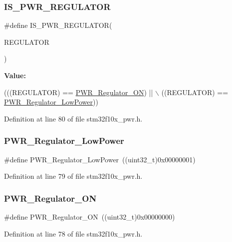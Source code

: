 \subsubsection{\texorpdfstring{I\+S\+\_\+\+P\+W\+R\+\_\+\+R\+E\+G\+U\+L\+A\+T\+OR}{IS\_PWR\_REGULATOR}}
{\footnotesize\ttfamily \#define I\+S\+\_\+\+P\+W\+R\+\_\+\+R\+E\+G\+U\+L\+A\+T\+OR(\begin{DoxyParamCaption}\item[{}]{R\+E\+G\+U\+L\+A\+T\+OR }\end{DoxyParamCaption})}

{\bfseries Value\+:}
\begin{DoxyCode}
(((REGULATOR) == \hyperlink{group___regulator__state__is___s_t_o_p__mode_gabf58b999bff6b4bf0fb5b97d74a75683}{PWR\_Regulator\_ON}) || \(\backslash\)
                                     ((REGULATOR) == \hyperlink{group___regulator__state__is___s_t_o_p__mode_ga13745136d094661358d373b67ebf1ac7}{PWR\_Regulator\_LowPower}))
\end{DoxyCode}


Definition at line 80 of file stm32f10x\+\_\+pwr.\+h.

\mbox{\label{group___regulator__state__is___s_t_o_p__mode_ga13745136d094661358d373b67ebf1ac7}} 
\subsubsection{\texorpdfstring{P\+W\+R\+\_\+\+Regulator\+\_\+\+Low\+Power}{PWR\_Regulator\_LowPower}}
{\footnotesize\ttfamily \#define P\+W\+R\+\_\+\+Regulator\+\_\+\+Low\+Power~((uint32\+\_\+t)0x00000001)}



Definition at line 79 of file stm32f10x\+\_\+pwr.\+h.

\mbox{\label{group___regulator__state__is___s_t_o_p__mode_gabf58b999bff6b4bf0fb5b97d74a75683}} 
\subsubsection{\texorpdfstring{P\+W\+R\+\_\+\+Regulator\+\_\+\+ON}{PWR\_Regulator\_ON}}
{\footnotesize\ttfamily \#define P\+W\+R\+\_\+\+Regulator\+\_\+\+ON~((uint32\+\_\+t)0x00000000)}



Definition at line 78 of file stm32f10x\+\_\+pwr.\+h.


